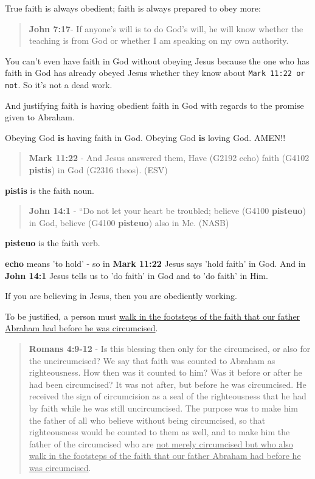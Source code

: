 \documentclass[11pt]{article}
\begin{document}
True faith is always obedient; faith is always prepared to obey more:

\begin{quote}
\textbf{John 7:17}- If anyone's will is to do God's will, he will know whether the teaching is from God or whether I am speaking on my own authority.
\end{quote}

You can't even have faith in God without obeying Jesus because the one who has faith in God has already obeyed Jesus whether they know about \texttt{Mark 11:22 or not}. So it's not a dead work.

And justifying faith is having obedient faith in God with regards to the promise given to Abraham.

Obeying God \textbf{is} having faith in God. Obeying God \textbf{is} loving God. AMEN!!

\begin{quote}
\textbf{Mark 11:22} - And Jesus answered them, Have (G2192 echo) faith (G4102 \textbf{pistis}) in God (G2316 theos). (ESV)
\end{quote}

\textbf{pistis} is the faith noun.

\begin{quote}
\textbf{John 14:1} - “Do not let your heart be troubled; believe (G4100 \textbf{pisteuo}) in God, believe (G4100 \textbf{pisteuo}) also in Me. (NASB)
\end{quote}

\textbf{pisteuo} is the faith verb.

\textbf{echo} means 'to hold' - so in \textbf{Mark 11:22} Jesus says 'hold faith' in God.
And in \textbf{John 14:1} Jesus tells us to 'do faith' in God and to 'do faith' in Him.

If you are believing in Jesus, then you are obediently working.

To be justified, a person must \uline{walk in the footsteps of the faith that our father Abraham had before he was circumcised}.

\begin{quote}
\textbf{Romans 4:9-12} - Is this blessing then only for the circumcised, or also for the uncircumcised? We say that faith was counted to Abraham as righteousness. How then was it counted to him? Was it before or after he had been circumcised? It was not after, but before he was circumcised. He received the sign of circumcision as a seal of the righteousness that he had by faith while he was still uncircumcised. The purpose was to make him the father of all who believe without being circumcised, so that righteousness would be counted to them as well, and to make him the father of the circumcised who are \uline{not merely circumcised but who also walk in the footsteps of the faith that our father Abraham had before he was circumcised}.
\end{quote}
\end{document}
